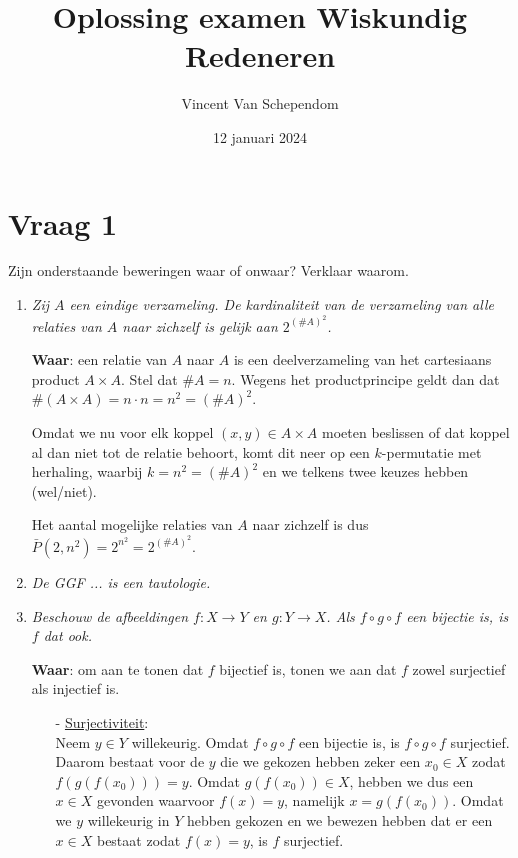 \documentclass[kulak]{kulakarticle} %
\title{Oplossing examen Wiskundig Redeneren}
\author{Vincent Van Schependom}
\date{12 januari 2024}
\begin{document}
	\maketitle

	\section*{Vraag 1}

	Zijn onderstaande beweringen waar of onwaar? Verklaar waarom.

	\begin{enumerate}
		\item \textit{Zij \(A\) een eindige verzameling. De kardinaliteit van de verzameling van alle relaties van \(A\) naar zichzelf is gelijk aan \(2^{(\#A)^2}\).}

		\textbf{Waar}: een relatie van \(A\) naar \(A\) is een deelverzameling van het cartesiaans product \(A\times A\). Stel dat \(\#A=n\). Wegens het productprincipe geldt dan dat \(\#(A\times A)=n\cdot n=n^2=(\# A)^2\).

		Omdat we nu voor elk koppel \((x,y)\in A\times A\) moeten beslissen of dat koppel al dan niet tot de relatie behoort, komt dit neer op een \(k\)-permutatie met herhaling, waarbij \(k=n^2=(\# A)^2\) en we telkens twee keuzes hebben (wel/niet).

		Het aantal mogelijke relaties van \(A\) naar zichzelf is dus \(\bar{P}(2,n^2)=2^{n^2}=2^{(\# A)^2}\).

		\item \textit{De GGF ... is een tautologie.}
		\item \textit{Beschouw de afbeeldingen \(f:X\rightarrow Y\) en \(g:Y \rightarrow X\). Als \(f\circ g \circ f\) een bijectie is, is \(f\) dat ook.}

		\textbf{Waar}: om aan te tonen dat \(f\) bijectief is, tonen we aan dat \(f\) zowel surjectief als injectief is.

		\begin{itemize}
			\item[-] \underline{Surjectiviteit}:\\
			Neem \(y \in Y\) willekeurig. Omdat \(f\circ g \circ f\) een bijectie is, is \(f\circ g \circ f\) surjectief. Daarom bestaat voor de \(y\) die we gekozen hebben zeker een \(x_0\in X\) zodat \(f(g(f(x_0)))=y\). Omdat \(g(f(x_0))\in X\), hebben we dus een \(x\in X\) gevonden waarvoor \(f(x)=y\), namelijk \(x=g(f(x_0))\). Omdat we \(y\) willekeurig in \(Y\) hebben gekozen en we bewezen hebben dat er een \(x \in X\) bestaat zodat \(f(x)=y\), is \(f\) surjectief.


\end{itemize}
\end{enumerate}
\end{document}
